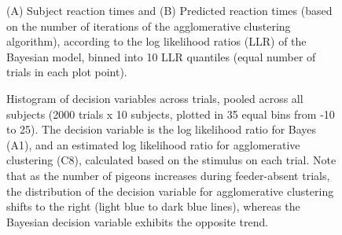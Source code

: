 \documentclass{article}
\begin{document}
\begin{figure}[th!]
\begin{center}
   \caption{(A) Subject reaction times and (B) Predicted reaction times (based on the number of iterations of the agglomerative clustering algorithm), according to the log likelihood ratios (LLR) of the Bayesian model, binned into 10 LLR quantiles (equal number of trials in each plot point).} 
   \label{fig:predictedRTs}
\end{center}
\end{figure}

\begin{figure}[ht]
\begin{center}
   \caption{Histogram of decision variables across trials, pooled across all subjects (2000 trials x 10 subjects, plotted in 35 equal bins from -10 to 25). The decision variable is the log likelihood ratio for Bayes (A1), and an estimated log likelihood ratio for agglomerative clustering (C8), calculated based on the stimulus on each trial. Note that as the number of pigeons increases during feeder-absent trials, the distribution of the decision variable for agglomerative clustering shifts to the right (light blue to dark blue lines), whereas the Bayesian decision variable exhibits the opposite trend.} 
   \label{fig:LLR}
\end{center}
\end{figure}
\end{document}
